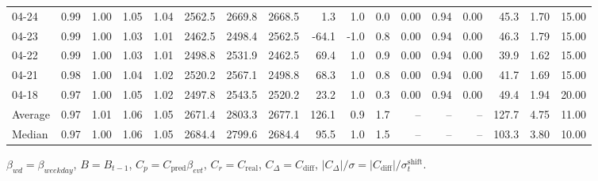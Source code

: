\begin{threeparttable}
{\begin{tabular}{lrrrrrrrrrrrrrrrr}
  04-24 &         0.99 &           1.00 &          1.05 &          1.04 & 2562.5 & 2669.8 & 2668.5 &        1.3 &                      1.0 &                 0.0 &       0.00 &      0.94 &           0.00 &             45.3 &            1.70 &                  15.00 \\
  04-23 &         0.99 &           1.00 &          1.03 &          1.01 & 2462.5 & 2498.4 & 2562.5 &      -64.1 &                     -1.0 &                 0.8 &       0.00 &      0.94 &           0.00 &             46.3 &            1.79 &                  15.00 \\
  04-22 &         0.99 &           1.00 &          1.03 &          1.01 & 2498.8 & 2531.9 & 2462.5 &       69.4 &                      1.0 &                 0.9 &       0.00 &      0.94 &           0.00 &             39.9 &            1.62 &                  15.00 \\
  04-21 &         0.98 &           1.00 &          1.04 &          1.02 & 2520.2 & 2567.1 & 2498.8 &       68.3 &                      1.0 &                 0.8 &       0.00 &      0.94 &           0.00 &             41.7 &            1.69 &                  15.00 \\
  04-18 &         0.97 &           1.00 &          1.05 &          1.02 & 2497.8 & 2543.5 & 2520.2 &       23.2 &                      1.0 &                 0.3 &       0.00 &      0.94 &           0.00 &             49.4 &            1.94 &                  20.00 \\
Average &         0.97 &           1.01 &          1.06 &          1.05 & 2671.4 & 2803.3 & 2677.1 &      126.1 &                      0.9 &                 1.7 &         -- &        -- &             -- &            127.7 &            4.75 &                  11.00 \\
 Median &         0.97 &           1.00 &          1.06 &          1.05 & 2684.4 & 2799.6 & 2684.4 &       95.5 &                      1.0 &                 1.5 &         -- &        -- &             -- &            103.3 &            3.80 &                  10.00 \\
\bottomrule
\end{tabular}
}
\begin{tablenotes}\footnotesize
\item $\beta_{wd}=\beta_{weekday}$, $B=B_{t-1}$,
$C_p=C_{\text{pred}}\beta_{evt}$, $C_r=C_{\text{real}}$,
$C_\Delta=C_{\text{diff}}$, $|C_\Delta|/\sigma=|C_{\text{diff}}|/\sigma_t^{\text{shift}}$.
\end{tablenotes}
\end{threeparttable}
\endgroup
